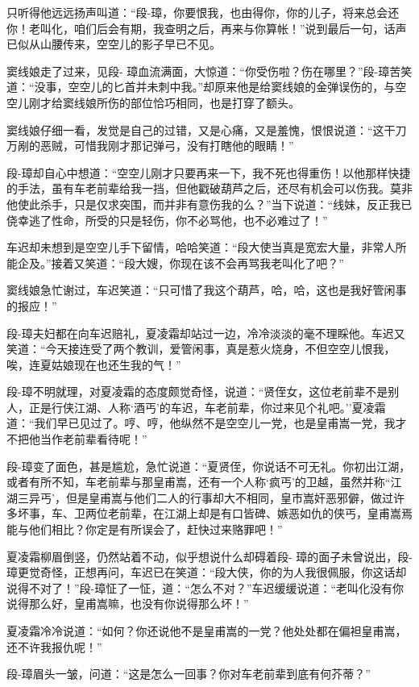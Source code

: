 \documentclass[12pt,oneside]{book}
\begin{document}
只听得他远远扬声叫道：``段-璋，你要恨我，也由得你，你的儿子，将来总会还你！老叫化，咱们后会有期，我查明之后，再来与你算帐！''说到最后一句，话声已似从山腰传来，空空儿的影子早已不见。

窦线娘走了过来，见段-
璋血流满面，大惊道：``你受伤啦？伤在哪里？''段-璋苦笑道：``没事，空空儿的匕首并未刺中我。''却原来他是给窦线娘的金弹误伤的，与空空儿刚才给窦线娘所伤的部位恰巧相同，也是打穿了额头。

窦线娘仔细一看，发觉是自己的过错，又是心痛，又是羞愧，恨恨说道：``这干刀万剐的恶贼，可惜我刚才那记弹弓，没有打瞎他的眼睛！''

段-璋却自心中想道：``空空儿刚才只要再来一下，我不死也得重伤！以他那样快捷的手法，虽有车老前辈给我一挡，但他戳破葫芦之后，还尽有机会可以伤我。莫非他使此杀手，只是仅求突围，而并非有意伤我的么？''当下说道：``线妹，反正我已侥幸逃了性命，所受的只是轻伤，你不必骂他，也不必难过了！''

车迟却未想到是空空儿手下留情，哈哈笑道：``段大使当真是宽宏大量，非常人所能企及。''接着又笑道：``段大嫂，你现在该不会再骂我老叫化了吧？''

窦线娘急忙谢过，车迟笑道：``只可惜了我这个葫芦，哈，哈，这也是我好管闲事的报应！''

段-璋夫妇都在向车迟赔礼，夏凌霜却站过一边，冷冷淡淡的毫不理睬他。车迟又笑道：``今天接连受了两个教训，爱管闲事，真是惹火烧身，不但空空儿恨我，唉，连夏姑娘现在也还生我的气！''

段-璋不明就理，对夏凌霜的态度颇觉奇怪，说道：``贤侄女，这位老前辈不是别人，正是行侠江湖、人称`酒丐'的车迟，车老前辈，你过来见个礼吧。''夏凌霜道：``我们早已见过了。哼、哼，他纵然不是空空儿一党，也是皇甫嵩一党，我才不把他当作老前辈看待呢！''

段-璋变了面色，甚是尴尬，急忙说道：``夏贤侄，你说话不可无礼。你初出江湖，或者有所不知，车老前辈与那皇甫嵩，还有一个人称`疯丐'的卫越，虽然并称``江湖三异丐'，但是皇甫嵩与他们二人的行事却大不相同，皇市嵩奸恶邪僻，做过许多坏事，车、卫两位老前辈，在江湖上却是有口皆碑、嫉恶如仇的侠丐，皇甫嵩焉能与他们相比？你定是有所误会了，赶快过来赂罪吧！''

夏凌霜柳眉倒竖，仍然站着不动，似乎想说什么却碍着段-
璋的面子未曾说出，段-璋更觉奇怪，正想再问，车迟已在笑道：``段大侠，你的为人我很佩服，你这话却说得不对了！''段-璋怔了一怔，道：``怎么不对？''车迟缓缓说道：``老叫化没有你说得那么好，皇甫嵩嘛，也没有你说得那么坏！''

夏凌霜冷冷说道：``如何？你还说他不是皇甫嵩的一党？他处处都在偏袒皇甫嵩，还不许我报仇呢！''

段-璋眉头一皱，问道：``这是怎么一回事？你对车老前辈到底有何芥蒂？''
\end{document}
